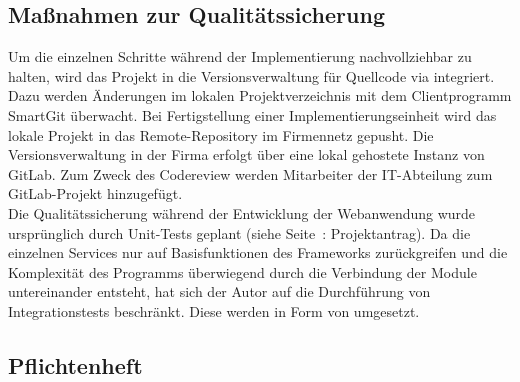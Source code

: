 \subsection{Maßnahmen zur Qualitätssicherung}
\label{sec:Qualitaetssicherung}
Um die einzelnen Schritte während der Implementierung nachvollziehbar zu halten,
wird das Projekt in die Versionsverwaltung für Quellcode via  integriert.
Dazu werden Änderungen im lokalen Projektverzeichnis mit dem Clientprogramm SmartGit überwacht.
Bei Fertigstellung einer Implementierungseinheit wird das lokale Projekt in das 
Remote-Repository im Firmennetz gepusht. Die Versionsverwaltung in der Firma erfolgt über eine lokal gehostete Instanz
von GitLab. Zum Zweck des Codereview werden Mitarbeiter der IT-Abteilung zum GitLab-Projekt hinzugefügt.\\
Die Qualitätssicherung während der Entwicklung der Webanwendung wurde ursprünglich durch Unit-Tests geplant
(siehe Seite~\pageref{Projektantrag}: Projektantrag).
Da die einzelnen Services nur auf Basisfunktionen des Frameworks zurückgreifen und die Komplexität des Programms 
überwiegend durch die Verbindung der Module untereinander entsteht, hat sich der Autor auf die Durchführung von
Integrationstests beschränkt. Diese werden in Form von  umgesetzt.

\subsection{Pflichtenheft}
\label{sec:Pflichtenheft}

\clearpage